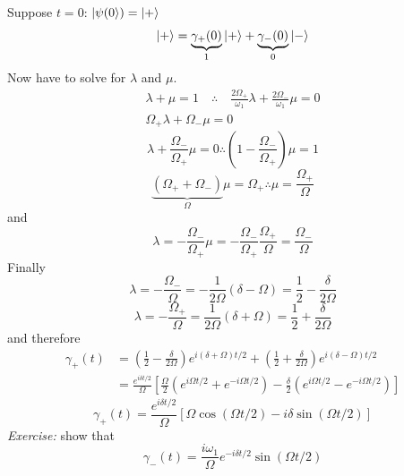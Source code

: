 \documentclass[12pt]{article}
\newcommand{\be}{\begin{equation}}
\newcommand{\ee}{\end{equation}}
\begin{document}
Suppose $t=0$: $\ket{\psi(0}) = \ket{+}$
\[
\ket{+}=
\underbrace{\gamma_+(0)}_{1} \ket{+}+ 
\underbrace{\gamma_-(0)}_{0} \ket{-} 
\]
Now have to solve for $\lambda$ and $\mu$.
\[
\begin{gathered}
\lambda+\mu=1 \quad \therefore \quad \frac{2 \Omega_{+}}{\omega_{1}} \lambda+\frac{2 \Omega_-}{\omega_{1}} \mu=0\\
\Omega_+\lambda+\Omega_-\mu=0
\end{gathered}
\]
\[
\lambda+\frac{\Omega_{-}}{\Omega_{+}} \mu=0 
\therefore\left(1-\frac{\Omega_{-}}{\Omega_{+}}\right) \mu=1
\]
\be
\underbrace{(\Omega_{+} + \Omega_{-})}%
_{\Omega}
\mu = \Omega_{+}
\therefore
\mu = \frac{\Omega_{+}}{\Omega}
\ee
and
\be
\lambda=-\frac{\Omega_{-}}{\Omega_{+}} \mu=-\frac{\Omega_{-}}{\Omega_{+}} \frac{\Omega_{+}}{\Omega}=
\frac{\Omega_{-}}{\Omega}
\ee
Finally
\be
\lambda=-\frac{\Omega_{-}}{\Omega}=-\frac{1}{2 \Omega}(\delta-\Omega)=\frac{1}{2}-\frac{\delta}{2 \Omega}
\ee
\be
\lambda=-\frac{\Omega_{+}}{\Omega}= \frac{1}{2 \Omega}(\delta+\Omega)=\frac{1}{2}+\frac{\delta}{2 \Omega}
\ee
and therefore
\[
\begin{aligned}
\gamma_{+}(t)
&=\left(\frac{1}{2}-\frac{\delta}{2 \Omega}\right) e^{i(\delta+\Omega) t / 2}+\left(\frac{1}{2}+\frac{\delta}{2 \Omega}\right) e^{i(\delta-\Omega) t / 2}\\
&=\frac{e^{i \delta t / 2}}{\Omega}\left[\frac{\Omega}{2}\left(e^{i \Omega t / 2}+e^{-i \Omega t / 2}\right)
-
\frac{\delta}{2}\left(e^{i \Omega t / 2}-e^{-i \Omega t / 2}\right)\right]
\end{aligned}
\]
\be
\boxed{
\gamma_{+}(t)=\frac{e^{i \delta t / 2}}{\Omega}[\Omega \cos (\Omega t / 2)-i \delta \sin (\Omega t / 2)]
}
\ee
\emph{Exercise:} show that
\be
\boxed{
\gamma_{-}(t)=\frac{i \omega_{1}}{\Omega} e^{-i \delta t / 2} \sin (\Omega t / 2)
}
\ee
\end{document}
